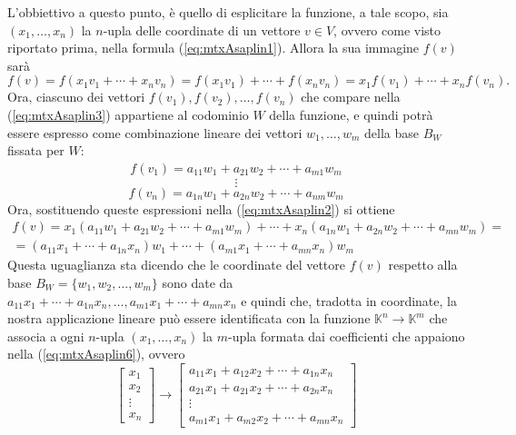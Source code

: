 \documentclass{book}
\theoremstyle{definition}
\theoremstyle{plain}
\begin{document}
L'obbiettivo a questo punto, è quello di esplicitare la funzione, a tale
scopo, sia $(x_1,\dots,x_n)$ la $n$-upla delle coordinate di un vettore
$v\in V$, ovvero come visto riportato prima, nella formula
(\ref{eq:mtxAsaplin1}). Allora la sua immagine $f(v)$ sarà
\begin{equation}
  \label{eq:mtxAsaplin3}
  f(v)=f(x_1v_1+\cdots+x_nv_n)=f(x_1v_1)+\cdots+f(x_nv_n)=x_1f(v_1)+\cdots+
  x_nf(v_n).
\end{equation}
Ora, ciascuno dei vettori $f(v_1),f(v_2),\dots,f(v_n)$ che compare nella
(\ref{eq:mtxAsaplin3}) appartiene al codominio $W$ della funzione, e
quindi potrà essere espresso come combinazione lineare dei vettori
$w_1,\dots,w_m$ della base $B_W$ fissata per $W$:
\begin{eqnarray}
  \label{eq:mtxAsaplin4}
  f(v_1)=a_{11}w_1+a_{21}w_2+\cdots+a_{m1}w_{m}
\end{eqnarray}
\begin{equation*}
  \vdots
\end{equation*}
\begin{equation}
  \label{eq:mtxAsaplin5}
  f(v_n)=a_{1n}w_1+a_{2n}w_2+\cdots+a_{nm}w_m
\end{equation}
Ora, sostituendo queste espressioni nella (\ref{eq:mtxAsaplin2}) si
ottiene
\begin{equation}
  \label{eq:mtxAsaplin6}
  \begin{matrix}
    f(v)=x_1(a_{11}w_1+a_{21}w_2+\cdots+a_{m1}w_m)+\cdots+x_n(a_{1n}w_1
    +a_{2n}w_2+\cdots+a_{mn}w_m)=\\
    =(a_{11}x_1+\cdots+a_{1n}x_n)w_1+\cdots+(a_{m1}x_1+\cdots+a_{mn}x_n)w_m
  \end{matrix}
\end{equation}
Questa uguaglianza sta dicendo che le coordinate del vettore $f(v)$
respetto alla base $B_W=\{w_1,w_2,\dots,w_m\}$ sono date da
$a_{11}x_1+\cdots+a_{1n}x_n,\dots,a_{m1}x_1+\cdots+a_{mn}x_n$ e quindi che,
tradotta in coordinate, la nostra applicazione lineare può essere
identificata con la funzione $\mathds{K}^n\to\mathds{K}^m$ che associa a
ogni $n$-upla $(x_1,\dots,x_n)$ la $m$-upla formata dai coefficienti che
appaiono nella (\ref{eq:mtxAsaplin6}), ovvero
\begin{equation}
  \label{eq:mtxAsaplin7}
  \begin{bmatrix}
    x_1\\
    x_2\\
    \vdots\\
    x_n
  \end{bmatrix}\to
  \begin{bmatrix}
    a_{11}x_1+a_{12}x_2+\cdots+a_{1n}x_n\\
    a_{21}x_1+a_{21}x_2+\cdots+a_{2n}x_n\\
    \vdots\\
    a_{m1}x_1+a_{m2}x_2+\cdots+a_{mn}x_n
  \end{bmatrix}
\end{equation}
\end{document}
